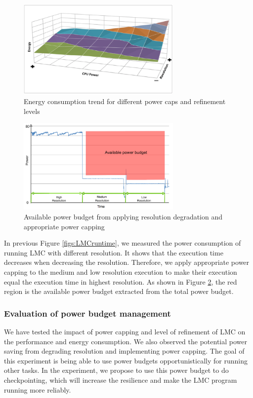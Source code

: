 \begin{figure}[H]
	\centering
    \includegraphics[width=8cm]{figs/Energy_consumption_trend.png}
        \caption{Energy consumption trend for different power caps and refinement levels}
        \label{fig:Energy_consumption_trend}
\end{figure}

\begin{figure}[H]
	\centering
    \includegraphics[width=8cm]{figs/Available_power_budget.png}
        \caption{Available power budget from applying resolution degradation and appropriate power capping}
        \label{fig:Available_power_budget}
\end{figure}


In previous Figure \ref{figs:LMCruntime}, we measured the power consumption of running LMC with different resolution. It shows that the execution time decreases when decreasing the resolution. Therefore, we apply appropriate power capping to the medium and low resolution execution to make their execution equal the execution time in highest resolution. As shown in Figure \ref{fig:Available_power_budget}, the red region is the available power budget extracted from the total power budget. 



\subsubsection{Evaluation of power budget management}
We have tested the impact of power capping and level of refinement of LMC on the performance and energy consumption. We also observed the potential power saving from degrading resolution and implementing power capping. The goal of this experiment is being able to use power budgets opportunistically for running other tasks. In the experiment, we propose to use this power budget to do  checkpointing, which will increase the resilience and make the LMC program running more reliably. 

